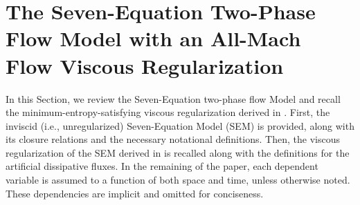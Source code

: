 \documentclass[preprint,10pt]{elsarticle}
\begin{document}
\section{The Seven-Equation Two-Phase Flow Model with an All-Mach Flow Viscous Regularization}\label{sec:7-equ-model}
%
In this Section, we review the Seven-Equation two-phase flow Model \cite{Berry_NED2010} and recall the minimum-entropy-satisfying viscous 
regularization derived  in \cite{Marco_paper_sem}.  
First, the inviscid (i.e., unregularized) Seven-Equation Model (SEM) is provided, along with its closure relations and the necessary 
notational definitions. 
Then, the viscous regularization of the SEM derived in \cite{Marco_paper_sem} is recalled along with the definitions for the artificial dissipative fluxes. 
In the remaining of the paper, each dependent variable is assumed to a function of both space and time, unless otherwise noted. 
These dependencies are implicit and omitted for conciseness. 
%
\end{document}
